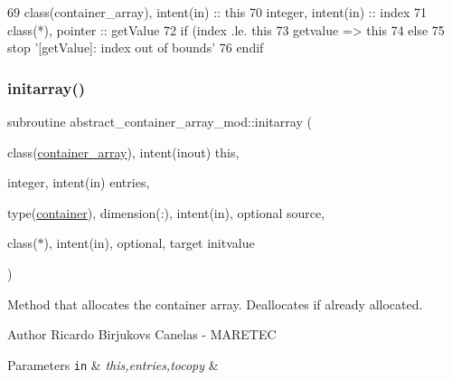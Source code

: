 \begin{DoxyCode}
69     \textcolor{keywordtype}{class}(container\_array), \textcolor{keywordtype}{intent(in)} :: this
70     \textcolor{keywordtype}{integer}, \textcolor{keywordtype}{intent(in)} :: index
71     \textcolor{keywordtype}{class}(*), \textcolor{keywordtype}{pointer} :: getValue
72     \textcolor{keywordflow}{if} (index .le. this%
73         getvalue => this%
74     \textcolor{keywordflow}{else}
75         stop \textcolor{stringliteral}{'[getValue]: index out of bounds'}
76 \textcolor{keywordflow}{    endif}
\end{DoxyCode}
\mbox{\label{namespaceabstract__container__array__mod_a793ed0fff6fc6c5823f1e7f119f44959}} 
\subsubsection{\texorpdfstring{initarray()}{initarray()}}
{\footnotesize\ttfamily subroutine abstract\+\_\+container\+\_\+array\+\_\+mod\+::initarray (\begin{DoxyParamCaption}\item[{class(\mbox{\hyperlink{structabstract__container__array__mod_1_1container__array}{container\+\_\+array}}), intent(inout)}]{this,  }\item[{integer, intent(in)}]{entries,  }\item[{type(\mbox{\hyperlink{structcontainer__mod_1_1container}{container}}), dimension(\+:), intent(in), optional}]{source,  }\item[{class($\ast$), intent(in), optional, target}]{initvalue }\end{DoxyParamCaption})\hspace{0.3cm}{\ttfamily [private]}}



Method that allocates the container array. Deallocates if already allocated. 

\begin{DoxyAuthor}{Author}
Ricardo Birjukovs Canelas -\/ M\+A\+R\+E\+T\+EC 
\end{DoxyAuthor}

\begin{DoxyParams}[1]{Parameters}
\mbox{\tt in}  & {\em this,entries,tocopy} & \\
\hline
\end{DoxyParams}


